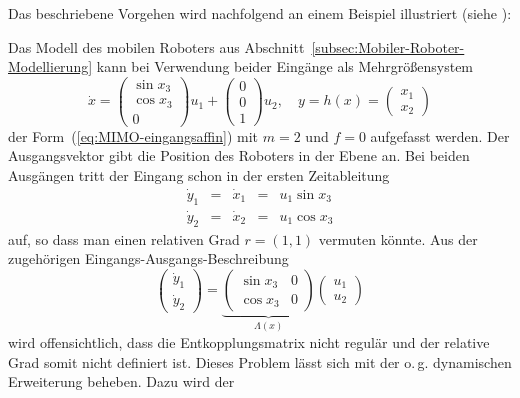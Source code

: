 Das beschriebene Vorgehen wird nachfolgend an einem Beispiel illustriert
(siehe \cite{oriolo2002}):
\begin{example}
\label{exa:Roboter-MIMO-relativer-grad1}Das Modell des mobilen Roboters
aus Abschnitt~\ref{subsec:Mobiler-Roboter-Modellierung} kann bei
Verwendung beider Eingänge als Mehrgrößensystem 
\begin{equation}
\dot{x}=\left(\begin{array}{c}
\sin x_{3}\\
\cos x_{3}\\
0
\end{array}\right)u_{1}+\left(\begin{array}{c}
0\\
0\\
1
\end{array}\right)u_{2},\quad y=h(x)=\left(\begin{array}{c}
x_{1}\\
x_{2}
\end{array}\right)\label{eq:roboter-MIMO}
\end{equation}
der Form~(\ref{eq:MIMO-eingangsaffin}) mit $m=2$ und $f=0$ aufgefasst
werden. Der Ausgangsvektor gibt die Position des Roboters in der Ebene
an. Bei beiden Ausgängen tritt der Eingang schon in der ersten Zeitableitung
\begin{equation}
\begin{array}{lclcl}
\dot{y}_{1} & = & \dot{x}_{1} & = & u_{1}\sin x_{3}\\
\dot{y}_{2} & = & \dot{x}_{2} & = & u_{1}\cos x_{3}
\end{array}\label{eq:roboter-dy-mimo-u}
\end{equation}
auf, so dass man einen relativen Grad $r=(1,1)$ vermuten könnte.
Aus der zugehörigen Eingangs-Ausgangs-Beschreibung 
\[
\left(\begin{array}{c}
\dot{y}_{1}\\
\dot{y}_{2}
\end{array}\right)=\underbrace{\left(\begin{array}{cc}
\sin x_{3} & 0\\
\cos x_{3} & 0
\end{array}\right)}_{{\displaystyle \Lambda}(x)}\left(\begin{array}{c}
u_{1}\\
u_{2}
\end{array}\right)
\]
wird offensichtlich, dass die Entkopplungsmatrix nicht regulär und
der relative Grad somit nicht definiert ist. Dieses Problem lässt
sich mit der o.\,g. dynamischen Erweiterung beheben. Dazu wird der

\end{example}
